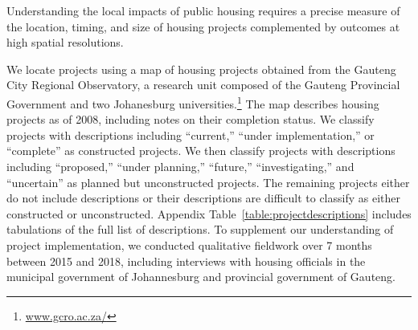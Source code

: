 \documentclass[12pt]{article}
\begin{document}
Understanding the local impacts of public housing requires a precise measure of the location, timing, and size of housing projects complemented by outcomes at high spatial resolutions.

We locate projects using a map of housing projects obtained from the Gauteng City Regional Observatory, a research unit composed of the Gauteng Provincial Government and two Johanesburg universities.\footnote{\href{url}{www.gcro.ac.za/}}  The map describes housing projects as of 2008, including notes on their completion status.  We classify projects with descriptions including ``current,'' ``under implementation,'' or ``complete'' as constructed projects.  We then classify projects with descriptions including ``proposed,'' ``under planning,'' ``future,'' ``investigating,'' and ``uncertain'' as planned but unconstructed projects.  The remaining projects either do not include descriptions or their descriptions are difficult to classify as either constructed or unconstructed.  Appendix Table~\ref{table:projectdescriptions} includes tabulations of the full list of descriptions.  To supplement our understanding of project implementation, we conducted qualitative fieldwork over 7 months between 2015 and 2018, including interviews with housing officials in the municipal government of Johannesburg and provincial government of Gauteng. 


\end{document}

